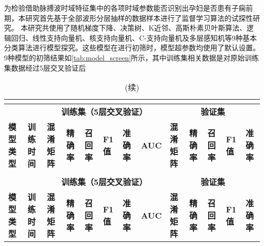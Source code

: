 为检验借助脉搏波时域特征集中的各项时域参数能否识别出孕妇是否患有子痫前期，本研究首先基于全部波形分层抽样的数据样本进行了监督学习算法的试探性研究\cite{scikit-learn}。
本研究共使用了随机梯度下降、决策树、K近邻、高斯朴素贝叶斯算法、逻辑回归、线性支持向量机、核支持向量机、C-支持向量机及多层感知机等9种基本分类算法进行模型探究。这些模型在进行初筛时，模型超参数均使用了默认设置\cite{scikit-learn}。
9种模型的初筛结果如\autoref{tab:model_screen}所示，其中训练集相关数据是对原始训练集数据经过5层交叉验证后
\begin{landscape}
      \begin{longtable}{m{3cm}<{\centering}m{1.7cm}<{\centering}m{2.3cm}<{\centering}m{1cm}<{\centering}m{1cm}<{\centering}m{1cm}<{\centering}m{1cm}<{\centering}m{1cm}<{\centering}m{2cm}<{\centering}m{1cm}<{\centering}m{1cm}<{\centering}m{1cm}<{\centering}m{1cm}<{\centering}}
            \caption{初筛结果}\\
            \label{tab:model_screen}\\
            \toprule
            &  & \multicolumn{6}{c}{\textbf{训练集（5层交叉验证）}} & \multicolumn{5}{c}{\textbf{验证集}}                                                                                                                                                                                                      \\
            \multirow{-2}{*}{\textbf{模型类型}} & \multirow{-2}{*}{\textbf{训练时间}} & \textbf{混淆矩阵} &  \textbf{精确率} &  \textbf{召回率} &  \textbf{F1值} &  \textbf{准确率} &  \textbf{AUC} &  \textbf{混淆矩阵} &  \textbf{精确率} &  \textbf{召回率} &  \textbf{F1值} &  \textbf{准确率}    \\
            \midrule
            \endfirsthead
            \caption[]{(续)}\\
            \midrule
            &  & \multicolumn{6}{c}{\textbf{训练集（5层交叉验证）}} & \multicolumn{5}{c}{\textbf{验证集}}                                                                                                                                                                                                      \\
            \multirow{-2}{*}{\textbf{模型类型}} & \multirow{-2}{*}{\textbf{训练时间}} & \textbf{混淆矩阵} &  \textbf{精确率} &  \textbf{召回率} &  \textbf{F1值} &  \textbf{准确率} &  \textbf{AUC} &  \textbf{混淆矩阵} &  \textbf{精确率} &  \textbf{召回率} &  \textbf{F1值} &  \textbf{准确率}    \\
            \midrule
            \endhead 

\end{longtable}
\end{landscape}
